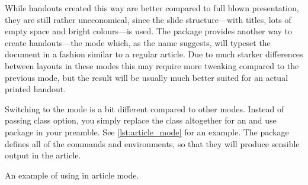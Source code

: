 While handouts created this way are better compared to full blown presentation,
they are still rather uneconomical, since the slide structure---with titles,
lots of empty space and bright colours---is used. The  package
provides another way to create handouts---the  mode which, as
the name suggests, will typeset the document in a fashion similar to a regular
article. Due to much starker differences between layouts in these modes this
may require more tweaking compared to the previous mode, but the result will be
usually much better suited for an actual printed handout.

Switching to the  mode is a bit different compared to other
 modes. Instead of passing class option, you simply replace the
class altogether for an  and use  package in
your preamble. See \autoref{lst:article_mode} for an example. The
 package defines all of the  commands and
environments, so that they will produce sensible output in the article.
\begin{listing}
  \begin{lined}{\textwidth}
  \end{lined}
  \caption{An example of using  in article
    mode.}\label{lst:article_mode}
\end{listing}

